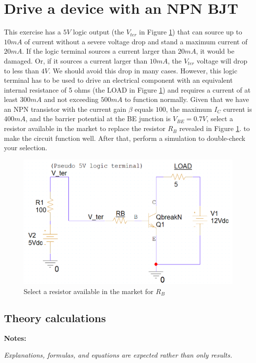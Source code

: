 \section{Drive a device with an NPN BJT}
This exercise has a $5V$ logic output (the $V_{ter}$ in Figure \ref{lab3_ex2_de}) that can source up to $10mA$ of current without a severe voltage drop and stand a maximum current of $20mA$. If the logic terminal sources a current larger than $20mA$, it would be damaged. Or, if it sources a current larger than $10mA$, the $V_{ter}$ voltage will drop to less than $4V$. We should avoid this drop in many cases.  However, this logic terminal has to be used to drive an electrical component with an equivalent internal resistance of 5 ohms (the LOAD in Figure \ref{lab3_ex2_de}) and requires a current of at least $300mA$ and not exceeding $500mA$ to function normally.
Given that we have an NPN transistor with the current gain $\beta$ equals $100$, the maximum $I_C$ current is $400mA$, and the barrier potential at the BE junction is $V_{BE} = 0.7V$, select a resistor available in the market to replace the resistor $R_B$ revealed in Figure \ref{lab3_ex2_de}. to make the circuit function well. After that, perform a simulation to double-check your selection.

\begin{figure}[h]
    \centering
    \includegraphics[width=12cm]{graphics/ex4/f1.png}
    \caption{Select a resistor available in the market for \(R_B\)}
    \label{lab3_ex2_de}
\end{figure}

\subsection{Theory calculations}

\textbf{Notes:}

\textit{Explanations, formulas, and equations are expected rather than only results.}


